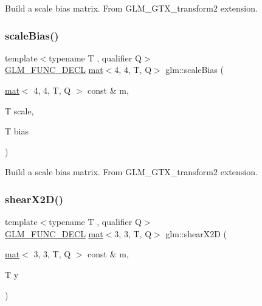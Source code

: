 Build a scale bias matrix. From G\+L\+M\+\_\+\+G\+T\+X\+\_\+transform2 extension. \mbox{\label{group__gtx__transform2_gae2bdd91a76759fecfbaef97e3020aa8e}} 
\subsubsection{\texorpdfstring{scale\+Bias()}{scaleBias()}\hspace{0.1cm}{\footnotesize\ttfamily [2/2]}}
{\footnotesize\ttfamily template$<$typename T , qualifier Q$>$ \\
\mbox{\hyperlink{setup_8hpp_ab2d052de21a70539923e9bcbf6e83a51}{G\+L\+M\+\_\+\+F\+U\+N\+C\+\_\+\+D\+E\+CL}} \mbox{\hyperlink{structglm_1_1mat}{mat}}$<$4, 4, T, Q$>$ glm\+::scale\+Bias (\begin{DoxyParamCaption}\item[{\mbox{\hyperlink{structglm_1_1mat}{mat}}$<$ 4, 4, T, Q $>$ const \&}]{m,  }\item[{T}]{scale,  }\item[{T}]{bias }\end{DoxyParamCaption})}

Build a scale bias matrix. From G\+L\+M\+\_\+\+G\+T\+X\+\_\+transform2 extension. \mbox{\label{group__gtx__transform2_gabf714b8a358181572b32a45555f71948}} 
\subsubsection{\texorpdfstring{shear\+X2\+D()}{shearX2D()}}
{\footnotesize\ttfamily template$<$typename T , qualifier Q$>$ \\
\mbox{\hyperlink{setup_8hpp_ab2d052de21a70539923e9bcbf6e83a51}{G\+L\+M\+\_\+\+F\+U\+N\+C\+\_\+\+D\+E\+CL}} \mbox{\hyperlink{structglm_1_1mat}{mat}}$<$3, 3, T, Q$>$ glm\+::shear\+X2D (\begin{DoxyParamCaption}\item[{\mbox{\hyperlink{structglm_1_1mat}{mat}}$<$ 3, 3, T, Q $>$ const \&}]{m,  }\item[{T}]{y }\end{DoxyParamCaption})}

